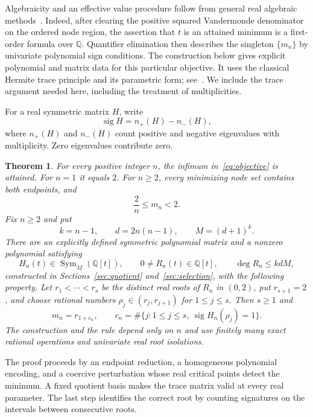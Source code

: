 \documentclass[11pt,leqno]{amsart}
\newtheorem{theorem}{Theorem}[section]
\theoremstyle{definition}
\theoremstyle{remark}
\numberwithin{equation}{section}
\newcommand{\Q}{\mathbb Q}
\newcommand{\sig}{\operatorname{sig}}
\begin{document}
Algebraicity and an effective value procedure follow from general real
algebraic methods~\cite{BPR}. Indeed, after clearing the positive squared
Vandermonde denominator on the ordered node region, the assertion that
$t$ is an attained minimum is a first-order formula over $\Q$.
Quantifier elimination then describes the singleton $\{m_n\}$ by
univariate polynomial sign conditions. The construction below gives
explicit polynomial and matrix data for this particular objective.
It uses the classical Hermite trace principle and its parametric form;
see~\cite{BPR,LeSafey}. We include the trace argument needed here, including
the treatment of multiplicities.

For a real symmetric matrix $H$, write
\[
 \sig H=n_+(H)-n_-(H),
\]
where $n_+(H)$ and $n_-(H)$ count positive and negative eigenvalues with
multiplicity. Zero eigenvalues contribute zero.

\begin{theorem}\label{thm:main}
For every positive integer $n$, the infimum in~\eqref{eq:objective} is
attained. For $n=1$ it equals $2$. For $n\geq2$, every minimizing node set
contains both endpoints, and
\begin{equation}\label{eq:range}
 \frac{2}{n}\leq m_n<2.
\end{equation}
Fix $n\geq2$ and put
\[
 k=n-1,\qquad d=2n(n-1),\qquad M=(d+1)^k.
\]
There are an explicitly defined symmetric polynomial matrix and a
nonzero polynomial satisfying
\[
 H_n(t)\in\operatorname{Sym}_{M}(\Q[t]),\qquad
 0\ne R_n(t)\in\Q[t],\qquad \deg R_n\leq kdM,
\]
constructed in Sections~\ref{sec:quotient} and~\ref{sec:selection}, with
the following property. Let $r_1<\cdots<r_s$ be the distinct real roots
of $R_n$ in $(0,2)$, put $r_{s+1}=2$, and choose rational numbers
$\rho_j\in(r_j,r_{j+1})$ for $1\leq j\leq s$. Then $s\geq1$ and
\begin{equation}\label{eq:main-rule}
 \boxed{\displaystyle
 m_n=r_{1+c_n},\qquad
 c_n=\#\{j:1\leq j\leq s,\ \sig H_n(\rho_j)=1\}.}
\end{equation}
The construction and the rule depend only on $n$ and use finitely many
exact rational operations and univariate real root isolations.
\end{theorem}

The proof proceeds by an endpoint reduction, a homogeneous polynomial
encoding, and a coercive perturbation whose real critical points detect
the minimum. A fixed quotient basis makes the trace matrix valid at
every real parameter. The last step identifies the correct root by
counting signatures on the intervals between consecutive roots.
\end{document}
